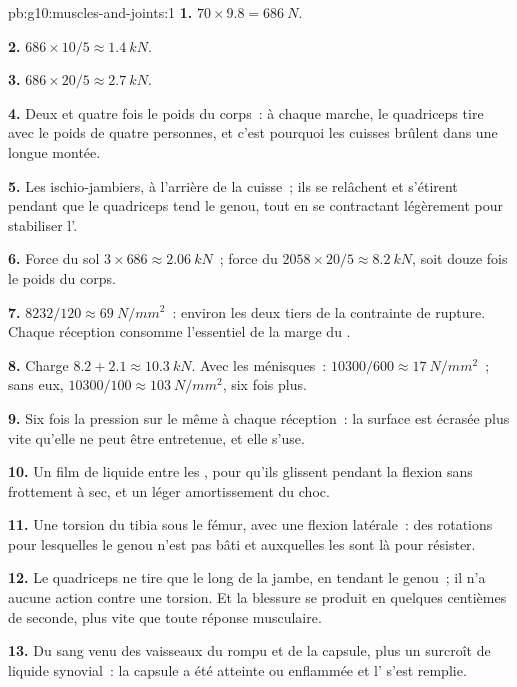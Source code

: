 \begin{solution}{pb:g10:muscles-and-joints:1}
\textbf{1.} $70 \times 9.8 = \qty{686}{N}$.

\textbf{2.} $686 \times 10/5 \approx \qty{1.4}{kN}$.

\textbf{3.} $686 \times 20/5 \approx \qty{2.7}{kN}$.

\textbf{4.} Deux et quatre fois le poids du corps~: à chaque marche, le
quadriceps tire avec le poids de quatre personnes, et c'est pourquoi
les cuisses brûlent dans une longue montée.

\textbf{5.} Les ischio-jambiers, à l'arrière de la cuisse~; ils se
relâchent et s'étirent pendant que le quadriceps tend le genou, tout en
se contractant légèrement pour stabiliser l'.

\textbf{6.} Force du sol $3 \times 686 \approx \qty{2.06}{kN}$~; force
du  $2058 \times 20/5 \approx \qty{8.2}{kN}$, soit douze fois le
poids du corps.

\textbf{7.} $8232/120 \approx \qty{69}{N/mm^2}$~: environ les deux tiers
de la contrainte de rupture. Chaque réception consomme l'essentiel de
la marge du .

\textbf{8.} Charge $8.2 + 2.1 \approx \qty{10.3}{kN}$. Avec les
ménisques~: $10300/600 \approx \qty{17}{N/mm^2}$~; sans eux, $10300/100 \approx
\qty{103}{N/mm^2}$, six fois plus.

\textbf{9.} Six fois la pression sur le même  à chaque
réception~: la surface est écrasée plus vite qu'elle ne peut être
entretenue, et elle s'use.

\textbf{10.} Un film de liquide entre les , pour qu'ils
glissent pendant la flexion sans frottement à sec, et un léger
amortissement du choc.

\textbf{11.} Une torsion du tibia sous le fémur, avec une flexion
latérale~: des rotations pour lesquelles le genou n'est pas bâti et
auxquelles les  sont là pour résister.

\textbf{12.} Le quadriceps ne tire que le long de la jambe, en tendant
le genou~; il n'a aucune action contre une torsion. Et la blessure se
produit en quelques centièmes de seconde, plus vite que toute réponse
musculaire.

\textbf{13.} Du sang venu des vaisseaux du  rompu et de la
capsule, plus un surcroît de liquide synovial~: la capsule a été
atteinte ou enflammée et l' s'est remplie.


\end{solution}
